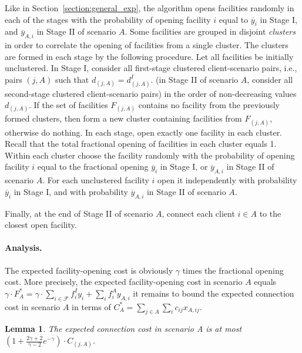 \documentclass[11pt]{article}
\newtheorem{lemma}[theorem]{Lemma}
\begin{document}
Like in Section~\ref{section:general_exp}, the algorithm opens facilities randomly in each of the stages
with the probability of opening facility $i$ equal to $\overline{y}_i$
in Stage I, and $\overline{y}_{A,i}$ in Stage II of scenario $A$.
Some facilities are grouped in disjoint \emph{clusters} in order to correlate 
the opening of facilities from a single cluster.
The clusters are formed in each stage by the following procedure.
Let all facilities be initially unclustered.
In Stage I, consider all first-stage clustered client-scenario pairs, 
i.e., pairs $(j,A)$ such that $d_{(j,A)} = d_{(j,A)}^I$.
(in Stage II of scenario $A$, consider all second-stage clustered client-scenario pairs)
in the order of non-decreasing values $d_{(j,A)}$.
If the set of facilities $F_{(j,A)}$ contains no facility
from the previously formed clusters, 
then form a new cluster containing facilities from $F_{(j,A)}$,
otherwise do nothing.
In each stage, open exactly one facility in each cluster.
Recall that the total fractional opening of facilities in each cluster
equals 1. Within each cluster choose the facility randomly with the probability
of opening facility $i$ equal to the fractional opening $\overline{y}_i$ 
in Stage I, or $\overline{y}_{A,i}$ in Stage II of scenario $A$.
For each unclustered facility $i$ open it independently with 
probability $\overline{y}_i$ in Stage I, and with probability $\overline{y}_{A,i}$ in Stage II of scenario $A$.

Finally, at the end of Stage II of scenario $A$, connect each client $i \in A$ to the 
closest open facility.

\paragraph{Analysis.}
The expected facility-opening cost is obviously $\gamma$ times the fractional opening cost.
More precisely, the expected facility-opening cost in scenario $A$ equals $\gamma \cdot F^*_A =
\gamma \cdot \sum_{i \in \mathcal{F}} f_i^I y_i +\sum_i f_i^A y_{A,i}$
it remains to bound the expected connection cost in scenario $A$ in terms of 
$C^*_A =\sum_{j \in A} \sum_i c_{ij} x_{A,ij}$. 

\begin{lemma}
The expected connection cost in scenario A is at most $(1+\frac{2\gamma+2}{\gamma-2} e^{-\gamma}) \cdot C_{(j,A)}$.
\end{lemma}
\end{document}
